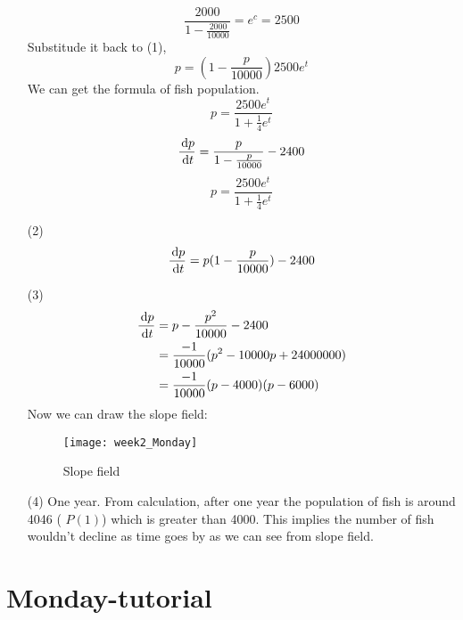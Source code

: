 \begin{example}
\begin{enumerate}
\[\frac{2000}{1-\frac{2000}{10000}}=e^c=2500
\]
Substitude it back to (1),
\[p=(1-\frac{p}{10000})2500e^t
\]
We can get the formula of fish population.
\[p=\frac{2500e^t}{1+\frac{1}{4}e^t}
\]
\[\frac{\,\mathrm{d} p}{\,\mathrm{d} t}=\frac{p}{1-\frac{p}{10000}}-2400
\]
\[p=\frac{2500e^t}{1+\frac{1}{4}e^t}
\]
\item[(2)]
\[\frac{\,\mathrm{d} p}{\,\mathrm{d} t}=p(1-\frac{p}{10000})-2400
\]
\item[(3)]
\[\begin{aligned}\frac{\,\mathrm{d} p}{\,\mathrm{d} t}&=p-\frac{p^2}{10000}-2400\\
&=\frac{-1}{10000}(p^2-10000p+24000000)\\
&=\frac{-1}{10000}(p-4000)(p-6000)
\end{aligned}
\]
Now we can draw the slope field:
\begin{figure}[H]
\centering
\texttt{[image: week2\_Monday]}
\caption{Slope field}
\end{figure}
\item[(4)]
One year. From calculation, after one year the population of fish is around 4046 ( $P(1)$) which is greater than 4000. This implies the number of fish wouldn't decline as time goes by as we can see from slope field.
\end{enumerate}
\end{example}



\section{Monday-tutorial}

